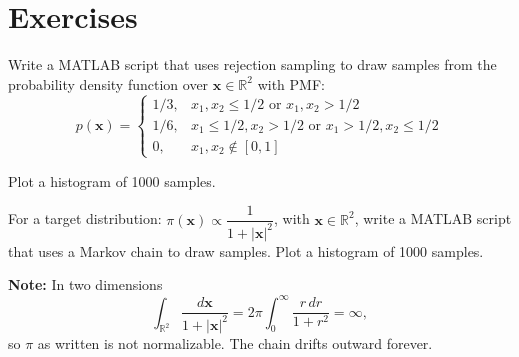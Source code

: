 \newpage
\section{Exercises}

\begin{exercise} %
    Write a MATLAB script that uses rejection sampling to draw samples from the probability density function over \(\mathbf{x}\in\mathbb{R}^2\) with PMF: 
    \[
        p(\mathbf{x}) = \begin{cases}
            1/3, & x_1, x_2 \leq 1/2 \text{ or } x_1,x_2 > 1/2 \\
            1/6, & x_1 \leq 1/2, x_2 > 1/2 \text{ or } x_1 > 1/2, x_2 \leq 1/2\\
            0, & x_1,x_2 \notin [0,1]
        \end{cases}
    \]

    Plot a histogram of 1000 samples.
\end{exercise}

\begin{solution}
    
\end{solution}

\begin{exercise} %
    For a target distribution: \(\pi(\mathbf{x})\propto \dfrac{1}{1+|\mathbf{x}|^2}\), with $\mathbf{x} \in \mathbb{R}^2$, write a MATLAB script that uses a Markov chain to draw samples. Plot a histogram of 1000 samples.
\end{exercise}

\begin{solution}
    

    \textbf{Note:} In two dimensions
    \[
        \int_{\mathbb{R}^2}\frac{d\mathbf{x}}{1+|\mathbf{x}|^{2}} = 2\pi\int_0^\infty\frac{r\,dr}{1+r^{2}}=\infty,
    \]
    so \(\pi\) as written is not normalizable. The chain drifts outward forever.
\end{solution}


